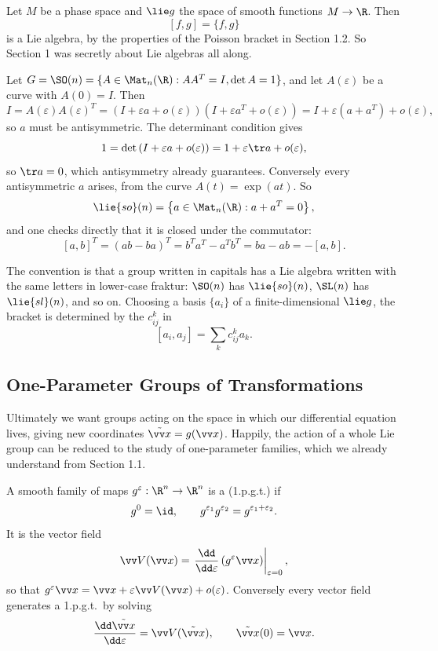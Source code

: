 \begin{example}
	Let $M$ be a phase space and $\lie g$ the space of smooth functions $M\to\R$. Then
	$$
	[f,g] = \{f,g\}
	$$
	is a Lie algebra, by the properties of the Poisson bracket in Section 1.2. So Section 1 was secretly about Lie algebras all along.
\end{example}

\begin{example}
	Let $G = \SO(n) = \{A\in\Mat_n(\R) : AA^T = I, \det A = 1\}$, and let $A(\varepsilon)$ be a curve with $A(0)=I$. Then
	$$
	I = A(\varepsilon)A(\varepsilon)^T = \left(I + \varepsilon a + o(\varepsilon)\right)\left(I + \varepsilon a^T+o(\varepsilon)\right) = I + \varepsilon(a+a^T) + o(\varepsilon),
	$$
	so $a$ must be antisymmetric. The determinant condition gives
	$$
	1 = \det\left(I + \varepsilon a + o(\varepsilon)\right) = 1 + \varepsilon\tr a + o(\varepsilon),
	$$
	so $\tr a = 0$, which antisymmetry already guarantees. Conversely every antisymmetric $a$ arises, from the curve $A(t) = \exp(at)$. So
	$$
	\lie{so}(n) = \left\{a\in\Mat_n(\R) : a + a^T = 0\right\},
	$$
	and one checks directly that it is closed under the commutator:
	$$
	[a,b]^T = (ab-ba)^T = b^Ta^T - a^Tb^T = ba - ab = -[a,b].
	$$
\end{example}

The convention is that a group written in capitals has a Lie algebra written with the same letters in lower-case fraktur: $\SO(n)$ has $\lie{so}(n)$, $\SL(n)$ has $\lie{sl}(n)$, and so on. Choosing a basis $\{a_i\}$ of a finite-dimensional $\lie g$, the bracket is determined by the  $c_{ij}^k$ in
$$
[a_i,a_j] = \sum_kc_{ij}^ka_k.
$$

\subsection{One-Parameter Groups of Transformations}

Ultimately we want groups acting on the space in which our differential equation lives, giving new coordinates $\tilde{\vv x} = g(\vv x)$. Happily, the action of a whole Lie group can be reduced to the study of one-parameter families, which we already understand from Section 1.1.

\begin{definition}
	A smooth family of maps $g^\varepsilon : \R^n\to\R^n$ is a  (1.p.g.t.) if
	$$
	g^0 = \id, \qquad g^{\varepsilon_1}g^{\varepsilon_2} = g^{\varepsilon_1+\varepsilon_2}.
	$$
	It is  the vector field
	$$
	\vv V(\vv x) = \left.\frac{\dd}{\dd\varepsilon}\left(g^\varepsilon\vv x\right)\right|_{\varepsilon=0},
	$$
	so that $g^\varepsilon\vv x = \vv x + \varepsilon\vv V(\vv x) + o(\varepsilon)$. Conversely every vector field generates a 1.p.g.t.\ by solving
	$$
	\frac{\dd\tilde{\vv x}}{\dd\varepsilon} = \vv V(\tilde{\vv x}), \qquad \tilde{\vv x}(0) = \vv x.
	$$
\end{definition}

